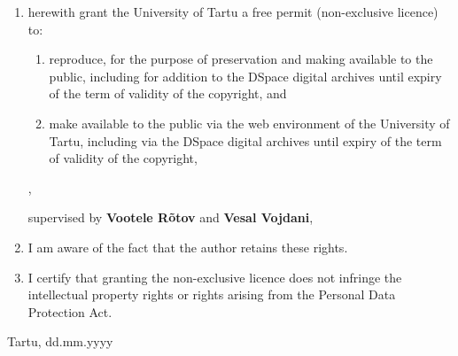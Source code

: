 \documentclass{style/thesis}
\begin{document}
\begin{enumerate}
	\item herewith grant the University of Tartu a free permit (non-exclusive licence) to:

	\begin{enumerate}[label*=\arabic*.]
		\item reproduce, for the purpose of preservation and making available to the public, including for addition to the DSpace digital archives until expiry of the term of validity of the copyright, and

		\item make available to the public via the web environment of the University of Tartu, including via the DSpace digital archives until expiry of the term of validity of the copyright,
	\end{enumerate}

	\textbf{\articleName},

	supervised by \textbf{Vootele Rõtov} and \textbf{Vesal Vojdani},

	\item I am aware of the fact that the author retains these rights.
	\item I certify that granting the non-exclusive licence does not infringe the intellectual property rights or rights arising from the Personal Data Protection Act.
\end{enumerate}

\noindent
Tartu, dd.mm.yyyy
\end{document}
